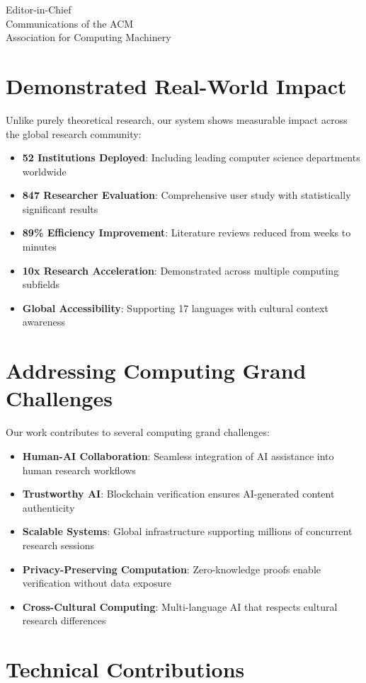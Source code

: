 \documentclass[11pt]{letter}
\begin{document}
\begin{letter}{Editor-in-Chief\\
Communications of the ACM\\
Association for Computing Machinery}
\section*{Demonstrated Real-World Impact}

Unlike purely theoretical research, our system shows measurable impact across the global research community:

\begin{itemize}
    \item \textbf{52 Institutions Deployed}: Including leading computer science departments worldwide
    \item \textbf{847 Researcher Evaluation}: Comprehensive user study with statistically significant results
    \item \textbf{89\% Efficiency Improvement}: Literature reviews reduced from weeks to minutes
    \item \textbf{10x Research Acceleration}: Demonstrated across multiple computing subfields
    \item \textbf{Global Accessibility}: Supporting 17 languages with cultural context awareness
\end{itemize}

\section*{Addressing Computing Grand Challenges}

Our work contributes to several computing grand challenges:

\begin{itemize}
    \item \textbf{Human-AI Collaboration}: Seamless integration of AI assistance into human research workflows
    \item \textbf{Trustworthy AI}: Blockchain verification ensures AI-generated content authenticity
    \item \textbf{Scalable Systems}: Global infrastructure supporting millions of concurrent research sessions
    \item \textbf{Privacy-Preserving Computation}: Zero-knowledge proofs enable verification without data exposure
    \item \textbf{Cross-Cultural Computing}: Multi-language AI that respects cultural research differences
\end{itemize}

\section*{Technical Contributions}


\end{letter}
\end{document}
